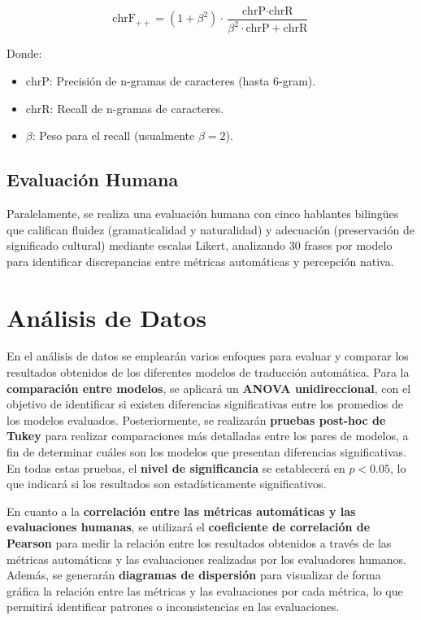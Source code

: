         \begin{equation}
        \text{chrF}_{++} = (1 + \beta^2) \cdot \frac{\text{chrP} \cdot \text{chrR}}{\beta^2 \cdot \text{chrP} + \text{chrR}}
        \end{equation}
        
        Donde:
        
        \begin{itemize}
          \item $\text{chrP}$: Precisión de n-gramas de caracteres (hasta 6-gram).
          \item $\text{chrR}$: Recall de n-gramas de caracteres.
          \item $\beta$: Peso para el recall (usualmente $\beta = 2$).
        \end{itemize}

    \subsection{Evaluación Humana}
  
    Paralelamente, se realiza una evaluación humana con cinco hablantes bilingües que califican fluidez (gramaticalidad y naturalidad) y adecuación (preservación de significado cultural) mediante escalas Likert, analizando 30 frases por modelo para identificar discrepancias entre métricas automáticas y percepción nativa.
    
    
    \section{Análisis de Datos}
    En el análisis de datos se emplearán varios enfoques para evaluar y comparar los resultados obtenidos de los diferentes modelos de traducción automática. Para la \textbf{comparación entre modelos}, se aplicará un \textbf{ANOVA unidireccional}, con el objetivo de identificar si existen diferencias significativas entre los promedios de los modelos evaluados. Posteriormente, se realizarán \textbf{pruebas post-hoc de Tukey} para realizar comparaciones más detalladas entre los pares de modelos, a fin de determinar cuáles son los modelos que presentan diferencias significativas. En todas estas pruebas, el \textbf{nivel de significancia} se establecerá en \textbf{$p < 0.05$}, lo que indicará si los resultados son estadísticamente significativos.

       
    En cuanto a la \textbf{correlación entre las métricas automáticas y las evaluaciones humanas}, se utilizará el \textbf{coeficiente de correlación de Pearson} para medir la relación entre los resultados obtenidos a través de las métricas automáticas y las evaluaciones realizadas por los evaluadores humanos. Además, se generarán \textbf{diagramas de dispersión} para visualizar de forma gráfica la relación entre las métricas y las evaluaciones por cada métrica, lo que permitirá identificar patrones o inconsistencias en las evaluaciones.
    

    
